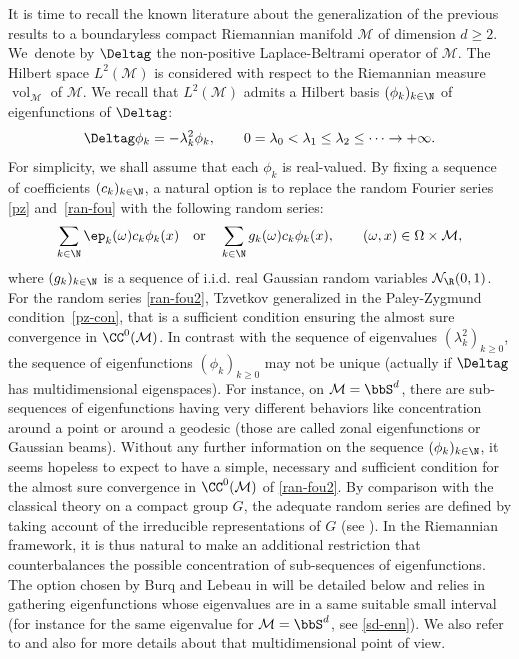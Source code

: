 It is time to recall the known literature about the generalization of the previous results to a boundaryless compact Riemannian manifold $\mathcal{M}$ of dimension $d\geq 2$.
We~denote by $\Deltag$ the non-positive Laplace-Beltrami operator of $\mathcal{M}$.
The Hilbert space $L^2(\mathcal{M})$ is considered with respect to the Riemannian measure $\operatorname{vol}_{\mathcal{M}}$ of $\mathcal{M}$.
We recall that $L^2(\mathcal{M})$ admits a Hilbert basis $(\phi_k)_{k\in \N}$ of eigenfunctions of $\Deltag$:
\begin{equation}\label{hilb-bas}
\Deltag \phi_k=-\lambda_k^2 \phi_k,\qquad 0=\lambda_0<\lambda_1\leq \lambda_2 \leq \dots \to +\infty.
\end{equation}
For simplicity, we shall assume that each $\phi_k$ is real-valued.
By fixing a sequence of coefficients $(c_k)_{k\in \N}$, a natural option is to replace the random Fourier series \eqref{pz} and~\eqref{ran-fou} with the following random series:
\begin{equation}\label{ran-fou2}
\sum_{k\in \N} \ep_k(\omega) c_k \phi_k(x) \quad \text{or}\quad \sum_{k\in \N} g_k(\omega) c_k \phi_k(x),\qquad (\omega,x)\in \Omega\times \mathcal{M},
\end{equation}
where $(g_k)_{k\in \N}$ is a sequence of i.i.d. real Gaussian random variables $\mathcal{N}_{\R}(0,1)$.
For the random series \eqref{ran-fou2}, Tzvetkov generalized in \cite{Tzvetkov4} the Paley-Zygmund condition~\eqref{pz-con}, that is a sufficient condition ensuring the almost sure convergence in $\CC^0(\mathcal{M})$. In contrast with the sequence of eigenvalues $(\lambda_k^2)_{k\geq 0}$, the sequence of eigenfunctions $(\phi_k)_{k\geq 0}$ may not be unique (actually if $\Deltag$ has multidimensional eigenspaces). For instance, on $\mathcal{M}=\bbS^d$, there are sub-sequences of eigenfunctions having very different behaviors like concentration around a point or around a geodesic (those are called zonal eigenfunctions or Gaussian beams).
Without any further information on the sequence $(\phi_k)_{k\in \N}$, it seems hopeless to expect to have a simple, necessary and sufficient condition for the almost sure convergence in $\CC^0(\mathcal{M})$ of \eqref{ran-fou2}.
By comparison with the classical theory on a compact group $G$, the adequate random series are defined by taking account of the irreducible representations of $G$ (see \cite{figa1967,pisier1981}). In the Riemannian framework, it is thus natural to make an additional restriction that counterbalances the possible concentration of sub-sequences of eigenfunctions.
The option chosen by Burq and Lebeau in \cite{burq-lebeau} will be detailed below and relies in gathering eigenfunctions whose eigenvalues are in a same suitable small interval (for instance for the same eigenvalue for $\mathcal{M}=\bbS^d$, see \eqref{sd-enn}).
We also refer to \cite[p.\,272]{imek-crusep} and also \cite{randomh,imek-aif}
for more details about that multidimensional point of view.

